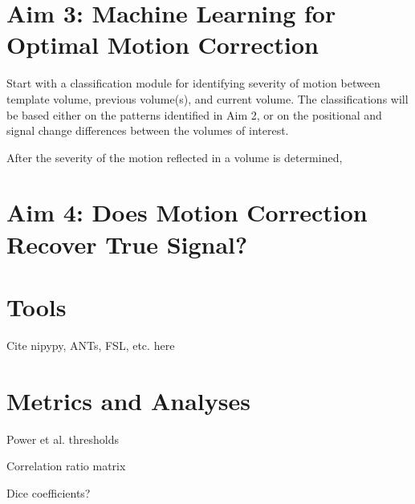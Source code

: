 \section{Aim 3: Machine Learning for Optimal Motion Correction}

Start with a classification module for identifying severity of motion between template volume, previous volume(s), and current volume. The classifications will be based either on the patterns identified in Aim 2, or on the positional and signal change differences between the volumes of interest.

After the severity of the motion reflected in a volume is determined, 

\section{Aim 4: Does Motion Correction Recover True Signal?}


\section{Tools}

Cite nipypy, ANTs, FSL, etc. here

\section{Metrics and Analyses}

Power et al. thresholds

Correlation ratio matrix

Dice coefficients?